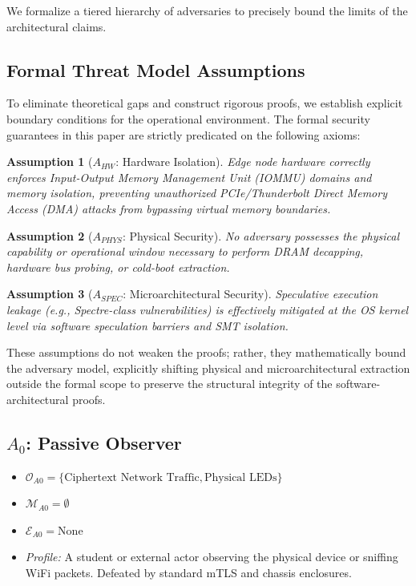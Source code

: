 \documentclass[conference]{IEEEtran}
\newtheorem{assumption}{Assumption}
\begin{document}
We formalize a tiered hierarchy of adversaries to precisely bound the limits of the architectural claims.

\subsection{Formal Threat Model Assumptions}
To eliminate theoretical gaps and construct rigorous proofs, we establish explicit boundary conditions for the operational environment. The formal security guarantees in this paper are strictly predicated on the following axioms:

\begin{assumption}[$A_{HW}$: Hardware Isolation]
Edge node hardware correctly enforces Input-Output Memory Management Unit (IOMMU) domains and memory isolation, preventing unauthorized PCIe/Thunderbolt Direct Memory Access (DMA) attacks from bypassing virtual memory boundaries.
\end{assumption}

\begin{assumption}[$A_{PHYS}$: Physical Security]
No adversary possesses the physical capability or operational window necessary to perform DRAM decapping, hardware bus probing, or cold-boot extraction.
\end{assumption}

\begin{assumption}[$A_{SPEC}$: Microarchitectural Security]
Speculative execution leakage (e.g., Spectre-class vulnerabilities) is effectively mitigated at the OS kernel level via software speculation barriers and SMT isolation.
\end{assumption}

These assumptions do not weaken the proofs; rather, they mathematically bound the adversary model, explicitly shifting physical and microarchitectural extraction outside the formal scope to preserve the structural integrity of the software-architectural proofs.

\subsection{$A_0$: Passive Observer}
\begin{itemize}
    \item $\mathcal{O}_{A0} = \{ \text{Ciphertext Network Traffic}, \text{Physical LEDs} \}$
    \item $\mathcal{M}_{A0} = \emptyset$
    \item $\mathcal{E}_{A0} = \text{None}$
    \item \textit{Profile:} A student or external actor observing the physical device or sniffing WiFi packets. Defeated by standard mTLS and chassis enclosures.
\end{itemize}
\end{document}
